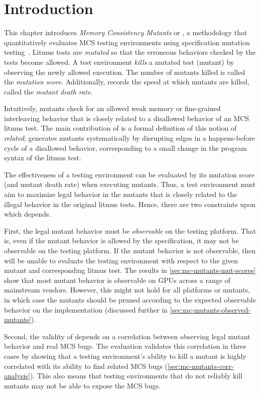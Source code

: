 \section{Introduction}
\label{sec:mc-mutants-introduction}

This chapter introduces \textit{Memory Consistency Mutants} or \sys, a methodology that quantitatively evaluates MCS testing environments using specification mutation testing~\cite{budd1985specification,demillo1978hints}. Litmus tests are \textit{mutated} so that the erroneous behaviors checked by the tests become allowed. A test environment \textit{kills} a mutated test (mutant) by observing the newly allowed execution. The number of mutants killed is called the \textit{mutation score}. Additionally, \sys records the speed at which mutants are killed, called the \textit{mutant death rate}.

Intuitively, mutants check for an allowed weak memory or fine-grained interleaving behavior that is closely related to a disallowed behavior of an MCS litmus test. The main contribution of \sys is a formal definition of this notion of \textit{related}; \sys generates mutants systematically by disrupting edges in a happens-before cycle of a disallowed behavior, corresponding to a small change in the program syntax of the litmus test.

The effectiveness of a testing environment can be evaluated by its mutation score (and mutant death rate) when executing mutants. Thus, a test environment must aim to maximize legal behavior in the mutants that is closely related to the illegal behavior in the original litmus tests. Hence, there are two constraints upon which \sys depends.

First, the legal mutant behavior must be \textit{observable} on the testing platform. That is, even if the mutant behavior is allowed by the specification, it may not be observable on the testing platform. If the mutant behavior is not observable, then \sys will be unable to evaluate the testing environment with respect to the given mutant and corresponding litmus test. The results in \mysec\ref{sec:mc-mutants-mut-scores} show that most mutant behavior is observable on GPUs across a range of mainstream vendors. However, this might not hold for all platforms or mutants, in which case the mutants should be pruned according to the expected observable behavior on the implementation (discussed further in \mysec\ref{sec:mc-mutants-observed-mutants}).

Second, the validity of \sys depends on a correlation between observing legal mutant behavior and real MCS bugs. The evaluation validates this correlation in three cases by showing that a testing environment's ability to kill a mutant is highly correlated with its ability to find related MCS bugs (\mysec\ref{sec:mc-mutants-corr-analysis}). This also means that testing environments that do not reliably kill mutants may not be able to expose the MCS bugs.

